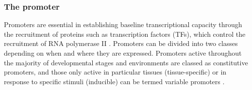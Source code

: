 \documentclass[../main.tex]{subfiles}
\begin{document}
\subsubsection{The promoter}\label{chapter1:the-promoter}
Promoters are essential in establishing baseline transcriptional capacity through the recruitment of proteins such as transcription factors (TFs), which control the recruitment of RNA polymerase II \autocite{portoPlantPromotersApproach2014}.
Promoters can be divided into two classes depending on when and where they are expressed.
Promoters active throughout the majority of developmental stages and environments are classed as constitutive promoters, and those only active in particular tissues (tissue\hyp{}specific) or in response to specific stimuli (inducible) can be termed variable promoters \autocite{bilasCisregulatoryElementsUsed2016}.
\end{document}
